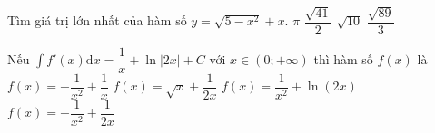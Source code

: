 \begin{ex}%
		Tìm giá trị lớn nhất của hàm số $y=\sqrt{5-x^2}+x$.
		\choice
		{$\pi $}
		{$\dfrac{\sqrt{41}}{2}$}
		{\True $\sqrt{10}$}
		{$\dfrac{\sqrt{89}}{3}$}
	\end{ex}
\begin{ex}%
		Nếu $\displaystyle\int{f'(x)}\mathrm{d}x=\dfrac{1}{x}+\ln\left| 2x\right|+C$ với $x\in \left(0;+\infty\right)$ thì hàm số $f(x)$ là
		\choice
		{\True $f(x)=-\dfrac{1}{x^2}+\dfrac{1}{x}$}
		{$f(x)=\sqrt{x}+\dfrac{1}{2x}$}
		{$f(x)=\dfrac{1}{x^2}+\ln \left(2x\right)$}
		{$f(x)=-\dfrac{1}{x^2}+\dfrac{1}{2x}$}
	\end{ex}
